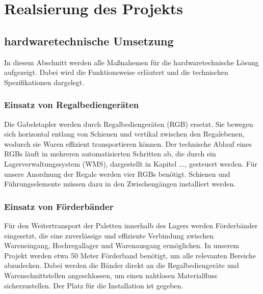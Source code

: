 \chapter{Realsierung des Projekts}

\section{hardwaretechnische Umsetzung}
In diesem Abschnitt werden alle Maßnahemen für die hardwaretechnische Lösung aufgezeigt. Dabei wird die Funktionsweise erläutert und die technischen Spezifikationen dargelegt.
\subsection{Einsatz von Regalbediengeräten}
Die Gabelstapler werden durch Regalbediengeräten (RGB) ersetzt. Sie bewegen sich horizontal entlang von Schienen und vertikal zwischen den Regalebenen, wodurch sie Waren effizient transportieren können. 
Der technische Ablauf eines RGBs läuft in mehreren automatisierten Schritten ab, die durch ein Lagerverwaltungssystem (WMS), dargestellt in Kapitel ..., gesteuert werden. Für unsere Anordnung der Regale werden vier RGBs benötigt. Schienen und Führungselemente müssen dazu in den Zwischengängen installiert werden.



\subsection{Einsatz von Förderbänder}
Für den Weitertransport der Paletten innerhalb des Lagers werden Förderbänder eingesetzt, die eine zuverlässige und effiziente Verbindung zwischen Wareneingang, Hochregallager und Warenausgang ermöglichen. In unserem Projekt werden etwa 50 Meter Förderband benötigt, um alle relevanten Bereiche abzudecken. Dabei werden die Bänder direkt an die Regalbediengeräte und Warenschnittstellen angeschlossen, um einen nahtlosen Materialfluss sicherzustellen. Der Platz für die Installation ist gegeben.

